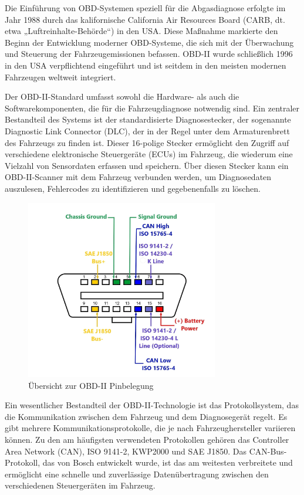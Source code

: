 \documentclass[oneside]{ausarbeitung}
\begin{document}
Die Einführung von OBD-Systemen speziell für die Abgasdiagnose erfolgte im Jahr 1988 durch das kalifornische California Air Resources Board (CARB, dt. etwa „Luftreinhalte-Behörde“) in den USA. Diese Maßnahme markierte den Beginn der Entwicklung moderner OBD-Systeme, die sich mit der Überwachung und Steuerung der Fahrzeugemissionen befassen. OBD-II wurde schließlich 1996 in den USA verpflichtend eingeführt und ist seitdem in den meisten modernen Fahrzeugen weltweit integriert.

Der OBD-II-Standard umfasst sowohl die Hardware- als auch die Softwarekomponenten, die für die Fahrzeugdiagnose notwendig sind. Ein zentraler Bestandteil des Systems ist der standardisierte Diagnosestecker, der sogenannte Diagnostic Link Connector (DLC), der in der Regel unter dem Armaturenbrett des Fahrzeugs zu finden ist. Dieser 16-polige Stecker ermöglicht den Zugriff auf verschiedene elektronische Steuergeräte (ECUs) im Fahrzeug, die wiederum eine Vielzahl von Sensordaten erfassen und speichern. Über diesen Stecker kann ein OBD-II-Scanner mit dem Fahrzeug verbunden werden, um Diagnosedaten auszulesen, Fehlercodes zu identifizieren und gegebenenfalls zu löschen.

\begin{figure}[h!]
  \centering
  \includegraphics[width=0.75\textwidth]{images/pinout_explanation.png}
  \caption{Übersicht zur OBD-II Pinbelegung}
  \label{fig:obd2_pinout}
\end{figure}

Ein wesentlicher Bestandteil der OBD-II-Technologie ist das Protokollsystem, das die Kommunikation zwischen dem Fahrzeug und dem Diagnosegerät regelt. Es gibt mehrere Kommunikationsprotokolle, die je nach Fahrzeughersteller variieren können. Zu den am häufigsten verwendeten Protokollen gehören das Controller Area Network (CAN), ISO 9141-2, KWP2000 und SAE J1850. Das CAN-Bus-Protokoll, das von Bosch entwickelt wurde, ist das am weitesten verbreitete und ermöglicht eine schnelle und zuverlässige Datenübertragung zwischen den verschiedenen Steuergeräten im Fahrzeug.
\end{document}
